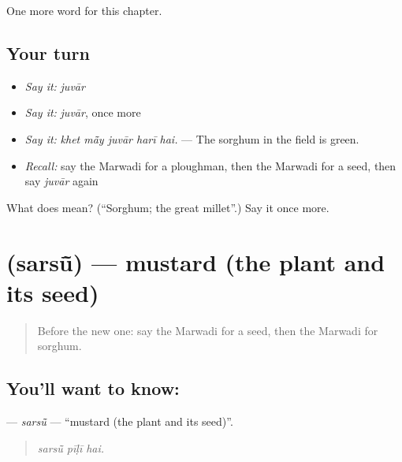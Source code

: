 \begin{grammarlens}[title={What you've built}]
One more word for this chapter.
\end{grammarlens}

\subsection*{Your turn}
\begin{itemize}
\raggedright
  \item \emph{Say it:} \emph{juvār}
  \item \emph{Say it:} \emph{juvār}, once more
  \item \emph{Say it:} \emph{khet mā̃y juvār harī hai.} — The sorghum in the field is green.
  \item \emph{Recall:} say the Marwadi for a ploughman, then the Marwadi for a seed, then say \emph{juvār} again
\end{itemize}

\begin{tcolorbox}[breakable,colback=teal!4,colframe=teal!35!black,title={Before you move on}]
What does  mean? (\textquotedblleft{}Sorghum; the great millet\textquotedblright{}.) Say it once more.
\end{tcolorbox}
\section[\texorpdfstring{\mw{सरसूं} (sarsū̃)}{सरसूं (sarsū̃)}]{ (sarsū̃) — mustard (the plant and its seed)}

\label{lesson:MW-C239-sarsu}



\begin{quote}
Before the new one: say the Marwadi for a seed, then the Marwadi for sorghum.
\end{quote}

\subsection*{You'll want to know: }
\textbf{} — \emph{sarsū̃} — \textquotedblleft{}mustard (the plant and its seed)\textquotedblright{}.

\begin{quote}
  
\end{quote}

\begin{quote}
\emph{sarsū̃ pīḷī hai.}
\end{quote}

